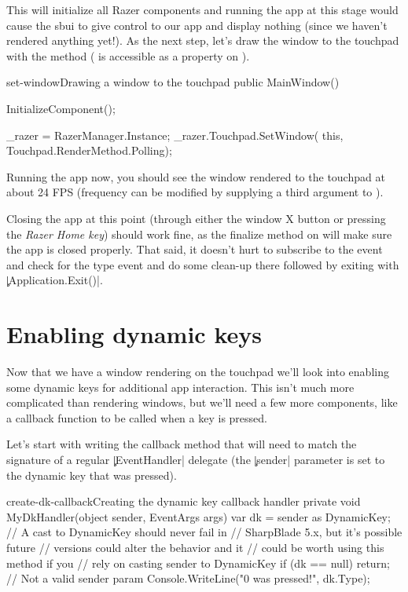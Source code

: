 This will initialize all Razer components and running the app at this stage would cause the \gls{sbui} to give control to our app and display nothing (since we haven't rendered anything yet!). As the next step, let's draw the window to the touchpad with the  method ( is accessible as a property on ).

\begin{csexample}{set-window}{Drawing a window to the touchpad}
public MainWindow()
{
    InitializeComponent();
    
    _razer = RazerManager.Instance;
    _razer.Touchpad.SetWindow(
        this,
        Touchpad.RenderMethod.Polling);
}
\end{csexample}

Running the app now, you should see the window rendered to the touchpad at about 24 FPS (frequency can be modified by supplying a third argument to ).

Closing the app at this point (through either the window X button or pressing the \emph{Razer Home key}) should work fine, as the finalize method on  will make sure the app is closed properly. That said, it doesn't hurt to subscribe to the  event and check for the  type event and do some clean-up there followed by exiting with \c|Application.Exit()|.

\section{Enabling dynamic keys}
Now that we have a window rendering on the touchpad we'll look into enabling some dynamic keys for additional app interaction. This isn't much more complicated than rendering windows, but we'll need a few more components, like a callback function to be called when a key is pressed.

Let's start with writing the callback method that will need to match the signature of a regular \c|EventHandler| delegate (the \c|sender| parameter is set to the dynamic key that was pressed).

\begin{csexample}{create-dk-callback}{Creating the dynamic key callback handler}
private void MyDkHandler(object sender, EventArgs args)
{
    var dk = sender as DynamicKey;
    // A cast to DynamicKey should never fail in
    // SharpBlade 5.x, but it's possible future
    // versions could alter the behavior and it
    // could be worth using this method if you
    // rely on casting sender to DynamicKey
    if (dk == null)
        return; // Not a valid sender param
    Console.WriteLine("{0} was pressed!", dk.Type);
}
\end{csexample}

